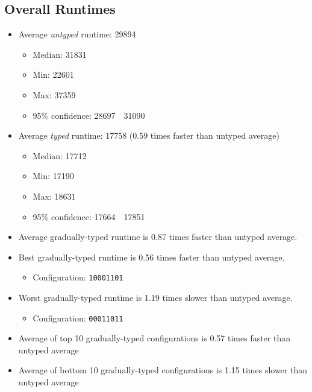 \documentclass{article}
\newcommand{\mono}[1]{\texttt{#1}}
\begin{document}
\subsection{Overall Runtimes}
\begin{itemize}
\item Average \emph{untyped} runtime: 29894
  \begin{itemize}
  \item Median: 31831
  \item Min: 22601
  \item Max: 37359
  \item 95\% confidence: 28697~\textendash~31090\end{itemize}
\item Average \emph{typed} runtime: 17758 (0.59 times faster than untyped average)
  \begin{itemize}
  \item Median: 17712
  \item Min: 17190
  \item Max: 18631
  \item 95\% confidence: 17664~\textendash~17851
\end{itemize}
\item Average gradually-typed runtime is 0.87 times faster than untyped average.
\item Best gradually-typed runtime is 0.56 times faster than untyped average.
\begin{itemize}\item Configuration: \mono{10001101}\end{itemize}
\item Worst gradually-typed runtime is 1.19 times slower than untyped average.
\begin{itemize}\item Configuration: \mono{00011011}\end{itemize}
\item Average of top 10 gradually-typed configurations is 0.57 times faster than untyped average
\item Average of bottom 10 gradually-typed configurations is 1.15 times slower than untyped average
\end{itemize}
\end{document}
